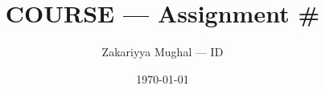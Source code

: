 
\title{\small COURSE --- Assignment \#}
\author{\small Zakariyya Mughal --- ID}
\date{\small \today}

\maketitle





